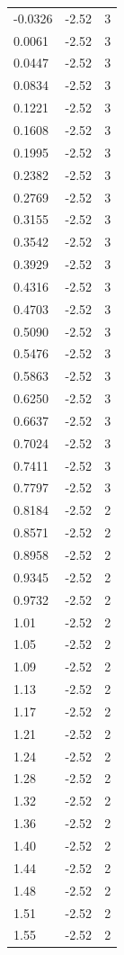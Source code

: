 \begin{longtable}{lrr}
  -0.0326 & -2.52 & 3 \\
  0.0061 & -2.52 & 3 \\
  0.0447 & -2.52 & 3 \\
  0.0834 & -2.52 & 3 \\
  0.1221 & -2.52 & 3 \\
  0.1608 & -2.52 & 3 \\
  0.1995 & -2.52 & 3 \\
  0.2382 & -2.52 & 3 \\
  0.2769 & -2.52 & 3 \\
  0.3155 & -2.52 & 3 \\
  0.3542 & -2.52 & 3 \\
  0.3929 & -2.52 & 3 \\
  0.4316 & -2.52 & 3 \\
  0.4703 & -2.52 & 3 \\
  0.5090 & -2.52 & 3 \\
  0.5476 & -2.52 & 3 \\
  0.5863 & -2.52 & 3 \\
  0.6250 & -2.52 & 3 \\
  0.6637 & -2.52 & 3 \\
  0.7024 & -2.52 & 3 \\
  0.7411 & -2.52 & 3 \\
  0.7797 & -2.52 & 3 \\
  0.8184 & -2.52 & 2 \\
  0.8571 & -2.52 & 2 \\
  0.8958 & -2.52 & 2 \\
  0.9345 & -2.52 & 2 \\
  0.9732 & -2.52 & 2 \\
  1.01 & -2.52 & 2 \\
  1.05 & -2.52 & 2 \\
  1.09 & -2.52 & 2 \\
  1.13 & -2.52 & 2 \\
  1.17 & -2.52 & 2 \\
  1.21 & -2.52 & 2 \\
  1.24 & -2.52 & 2 \\
  1.28 & -2.52 & 2 \\
  1.32 & -2.52 & 2 \\
  1.36 & -2.52 & 2 \\
  1.40 & -2.52 & 2 \\
  1.44 & -2.52 & 2 \\
  1.48 & -2.52 & 2 \\
  1.51 & -2.52 & 2 \\
  1.55 & -2.52 & 2 \\

\end{longtable}
